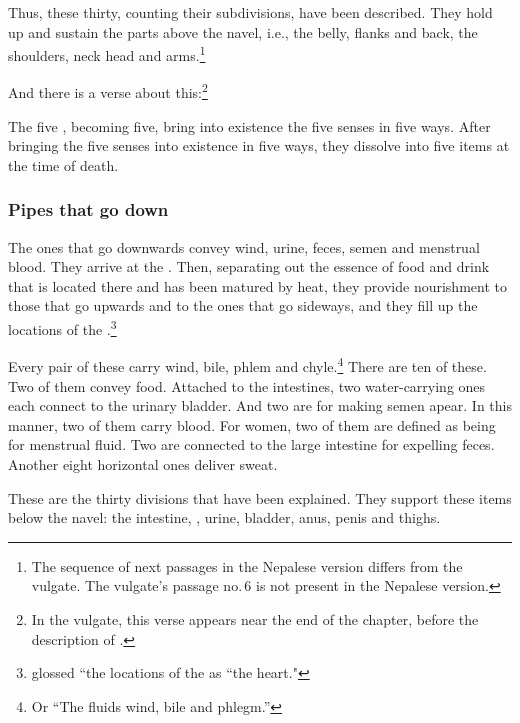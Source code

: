 \begin{translation}
    Thus, these thirty, counting their subdivisions, have been described.
    They hold up and sustain the parts above the navel, i.e., the belly,
    flanks and back, the shoulders, neck head and arms.\footnote{The sequence
        of next passages in the Nepalese version differs from the vulgate. The vulgate's
        passage no.\,6 is not present in the Nepalese version.}

    \item[11] 
    
    And there is a verse about this:\footnote{In the
    vulgate, this verse appears near the end of the chapter, before
    the description of .}
    \begin{sloka}
        The five , becoming five, bring
        into existence the five senses in five ways. After bringing the
        five senses into existence in five ways,  they dissolve into five
        items at the time of death.
    \end{sloka}


\subsubsection{Pipes that go down}

    \item [7]

    The ones that go downwards convey wind, urine, feces, semen and
    menstrual blood.  They arrive at the .
    Then, separating out the essence of food and drink that is located
    there and has been matured by heat, they provide nourishment to those that
    go upwards and to the ones that go sideways, and they fill up the locations of the
    .\footnote{ glossed ``the locations of the 
        as ``the heart."}

    Every pair of these carry wind, bile, phlem and chyle.\footnote{Or ``The fluids wind, bile and phlegm.''} There are ten of these.  Two of them convey food.  Attached to the intestines, two water-carrying ones each connect to the urinary bladder.  And two are for making semen apear. In this manner, two of them carry blood.  For women, two of them are defined as being for menstrual fluid. Two are connected to the large intestine for expelling feces. Another eight horizontal ones deliver sweat. 

    These are the thirty divisions that have been explained. They support these items below the navel: the intestine, , urine, bladder, anus, penis and thighs. 



\end{translation}
